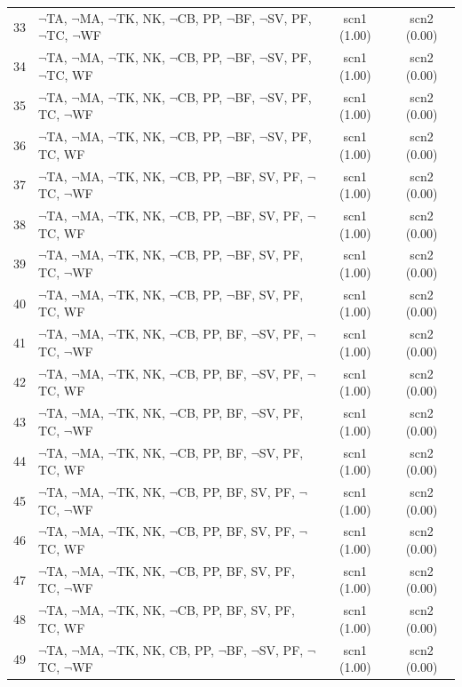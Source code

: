 \documentclass[12pt]{article}
\begin{document}
\begin{longtable}{|l|l|c|c|}
33 & $\neg$TA, $\neg$MA, $\neg$TK, NK, $\neg$CB, PP, $\neg$BF, $\neg$SV, PF, $\neg$TC, $\neg$WF & scn1 (1.00) & scn2 (0.00)\\
34 & $\neg$TA, $\neg$MA, $\neg$TK, NK, $\neg$CB, PP, $\neg$BF, $\neg$SV, PF, $\neg$TC, WF & scn1 (1.00) & scn2 (0.00)\\
35 & $\neg$TA, $\neg$MA, $\neg$TK, NK, $\neg$CB, PP, $\neg$BF, $\neg$SV, PF, TC, $\neg$WF & scn1 (1.00) & scn2 (0.00)\\
36 & $\neg$TA, $\neg$MA, $\neg$TK, NK, $\neg$CB, PP, $\neg$BF, $\neg$SV, PF, TC, WF & scn1 (1.00) & scn2 (0.00)\\
37 & $\neg$TA, $\neg$MA, $\neg$TK, NK, $\neg$CB, PP, $\neg$BF, SV, PF, $\neg$TC, $\neg$WF & scn1 (1.00) & scn2 (0.00)\\
38 & $\neg$TA, $\neg$MA, $\neg$TK, NK, $\neg$CB, PP, $\neg$BF, SV, PF, $\neg$TC, WF & scn1 (1.00) & scn2 (0.00)\\
39 & $\neg$TA, $\neg$MA, $\neg$TK, NK, $\neg$CB, PP, $\neg$BF, SV, PF, TC, $\neg$WF & scn1 (1.00) & scn2 (0.00)\\
40 & $\neg$TA, $\neg$MA, $\neg$TK, NK, $\neg$CB, PP, $\neg$BF, SV, PF, TC, WF & scn1 (1.00) & scn2 (0.00)\\
41 & $\neg$TA, $\neg$MA, $\neg$TK, NK, $\neg$CB, PP, BF, $\neg$SV, PF, $\neg$TC, $\neg$WF & scn1 (1.00) & scn2 (0.00)\\
42 & $\neg$TA, $\neg$MA, $\neg$TK, NK, $\neg$CB, PP, BF, $\neg$SV, PF, $\neg$TC, WF & scn1 (1.00) & scn2 (0.00)\\
43 & $\neg$TA, $\neg$MA, $\neg$TK, NK, $\neg$CB, PP, BF, $\neg$SV, PF, TC, $\neg$WF & scn1 (1.00) & scn2 (0.00)\\
44 & $\neg$TA, $\neg$MA, $\neg$TK, NK, $\neg$CB, PP, BF, $\neg$SV, PF, TC, WF & scn1 (1.00) & scn2 (0.00)\\
45 & $\neg$TA, $\neg$MA, $\neg$TK, NK, $\neg$CB, PP, BF, SV, PF, $\neg$TC, $\neg$WF & scn1 (1.00) & scn2 (0.00)\\
46 & $\neg$TA, $\neg$MA, $\neg$TK, NK, $\neg$CB, PP, BF, SV, PF, $\neg$TC, WF & scn1 (1.00) & scn2 (0.00)\\
47 & $\neg$TA, $\neg$MA, $\neg$TK, NK, $\neg$CB, PP, BF, SV, PF, TC, $\neg$WF & scn1 (1.00) & scn2 (0.00)\\
48 & $\neg$TA, $\neg$MA, $\neg$TK, NK, $\neg$CB, PP, BF, SV, PF, TC, WF & scn1 (1.00) & scn2 (0.00)\\
49 & $\neg$TA, $\neg$MA, $\neg$TK, NK, CB, PP, $\neg$BF, $\neg$SV, PF, $\neg$TC, $\neg$WF & scn1 (1.00) & scn2 (0.00)\\

\end{longtable}
\end{document}
